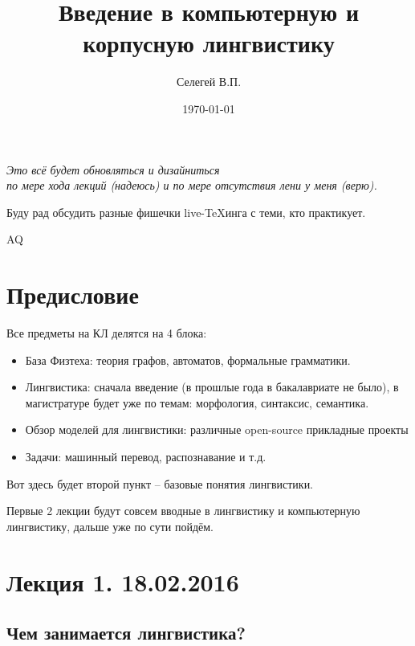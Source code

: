 \documentclass[a4paper,12pt]{article}
\author{Селегей В.П.}
\title{Введение в компьютерную и корпусную лингвистику}
\date{\today}
\theoremstyle{plain} %
\theoremstyle{definition} %
\theoremstyle{remark} %
\begin{document}
	
	\maketitle
	
	\setcounter{section}{-1}
	
	{\flushright \it 	
		Это всё будет обновляться и дизайниться\\ по мере хода лекций (надеюсь) и по мере отсутствия лени у меня (верю).
		
		Буду рад обсудить разные фишечки live-TeXинга с теми, кто практикует.
		
		AQ %
		
	}
	
	\section { Предисловие }
	
	Все предметы на КЛ делятся на 4 блока:
	
	\begin{itemize}
		
		\item База Физтеха: теория графов, автоматов, формальные грамматики.
		
		\item Лингвистика: сначала введение (в прошлые года в бакалавриате не было), в магистратуре будет уже по темам: морфология, синтаксис, семантика.
		
		\item Обзор моделей для лингвистики: различные open-source прикладные проекты
		
		\item Задачи: машинный перевод, распознавание и т.д.
			
	\end{itemize}
	
	Вот здесь будет второй пункт -- базовые понятия лингвистики.
	
	Первые 2 лекции будут совсем вводные в лингвистику и компьютерную лингвистику, дальше уже по сути пойдём.
	
	\section { Лекция 1. 18.02.2016 }
	
	\subsection { Чем занимается лингвистика? }
	
\end{document}
